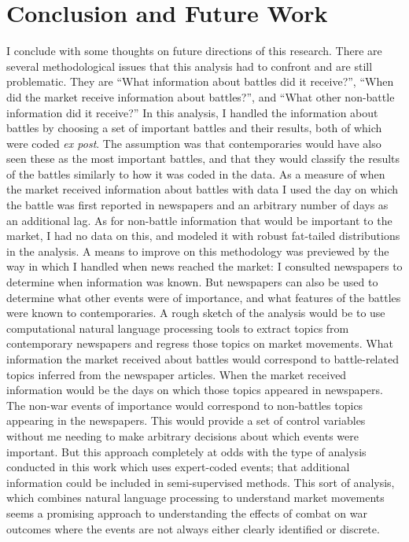 

\section{Conclusion and Future Work}
\label{sec:conclusion}

I conclude with some thoughts on future directions of this research.
There are several methodological issues that this analysis had to confront and are still problematic.
They are ``What information about battles did it receive?'', ``When did the market receive information about battles?'', and ``What other non-battle information did it receive?''
In this analysis, I handled the information about battles by choosing a set of important battles and their results, both of which were coded \textit{ex post}.
The assumption was that contemporaries would have also seen these as the most important battles, and that they would classify the results of the battles similarly to how it was coded in the data.
As a measure of when the market received information about battles with data I used the day on which the battle was first reported in newspapers and an arbitrary number of days as an additional lag.
As for non-battle information that would be important to the market, I had no data on this, and modeled it with robust fat-tailed distributions in the analysis.
A means to improve on this methodology was previewed by the way in which I handled when news reached the market: I consulted newspapers to determine when information was known.
But newspapers can also be used to determine what other events were of importance, and what features of the battles were known to contemporaries.
A rough sketch of the analysis would be to use computational natural language processing tools to extract topics from contemporary newspapers and regress those topics on market movements.
What information the market received about battles would correspond to battle-related topics inferred from the newspaper articles.
When the market received information would be the days on which those topics appeared in newspapers.
The non-war events of importance would correspond to non-battles topics appearing in the newspapers.
This would provide a set of control variables without me needing to make arbitrary decisions about which events were important.
But this approach completely at odds with the type of analysis conducted in this work which uses expert-coded events; that additional information could be included in semi-supervised methods.
This sort of analysis, which combines natural language processing to understand market movements seems a promising approach to understanding the effects of combat on war outcomes where the events are not always either clearly identified or discrete. 


